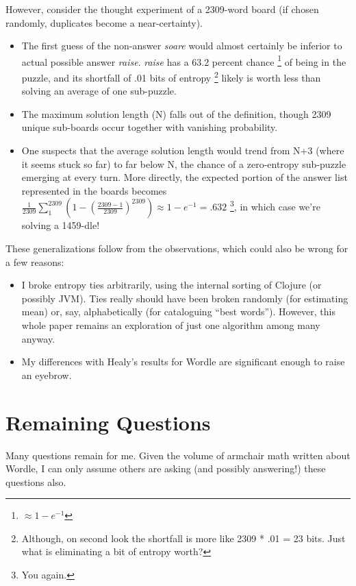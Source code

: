 \documentclass[11pt, oneside]{article} 	%
\begin{document}
However, consider the thought experiment of a 2309-word board (if chosen randomly, duplicates become a near-certainty).
\begin{itemize}
\item The first guess of the non-answer \emph{soare} would almost certainly be inferior to actual possible answer \emph{raise}. \emph{raise} has a 63.2 percent chance \footnote{$\approx 1- e^{-1}$} of being in the puzzle, and its shortfall of .01 bits of entropy \footnote{Although, on second look the shortfall is more like 2309 * .01 = 23 bits. Just what is eliminating a bit of entropy worth?} likely is worth less than solving an average of one sub-puzzle.
\item The maximum solution length (N) falls out of the definition, though 2309 unique sub-boards occur together with vanishing probability.
\item One suspects that the average solution length would trend from N+3 (where it seems stuck so far) to far below N, the chance of a zero-entropy sub-puzzle emerging at every turn. More directly, the expected portion of the answer list represented in the boards becomes $\frac{1}{2309} \sum_1^{2309} (1 - (\frac{2309 - 1}{2309})^{2309}) \approx 1 - e^{-1} = .632$ \footnote {You again.}, in which case we're solving a 1459-dle!
\end{itemize}

These generalizations follow from the observations, which could also be wrong for a few reasons:
\begin{itemize}
\item I broke entropy ties arbitrarily, using the internal sorting of Clojure (or possibly JVM). Ties really should have been broken randomly (for estimating mean) or, say, alphabetically (for cataloguing ``best words''). However, this whole paper remains an exploration of just one algorithm among many anyway.
\item My differences with Healy's \cite{1} results for Wordle are significant enough to raise an eyebrow. 
\end{itemize}

\section{Remaining Questions}

Many questions remain for me. Given the volume of armchair math written about Wordle, I can only assume others are asking (and possibly answering!) these questions also.
\end{document}
